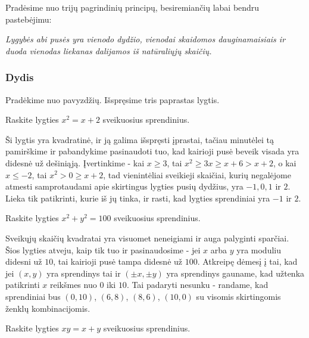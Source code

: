 Pradėsime nuo trijų pagrindinių principų, besiremiančių labai bendru
pastebėjimu:

\smallskip
\begin{center}\emph{Lygybės abi pusės yra vienodo dydžio, vienodai skaidomos
dauginamaisiais ir duoda vienodas liekanas dalijamos iš natūraliųjų
skaičių.}\end{center}
\smallskip

\subsubsection{Dydis}

Pradėkime nuo pavyzdžių. Išspręsime tris paprastas lygtis.
\begin{pav} 
  Raskite lygties $x^2 = x + 2$ sveikuosius sprendinius.
\end{pav}

\begin{sprendimas}
  Ši lygtis yra kvadratinė, ir ją galima išspręsti įprastai, tačiau minutėlei tą
  pamirškime ir pabandykime pasinaudoti tuo, kad kairioji pusė beveik visada yra didesnė
  už dešiniąją. Įvertinkime - kai $x\geq 3$, tai $x^2 \geq 3x \geq x + 6 >
  x+2$, o kai $x\leq -2$, tai $x^2 > 0 \geq x+2$, tad vienintėliai sveikieji
  skaičiai, kurių negalėjome atmesti samprotaudami apie skirtingus lygties
  pusių dydžius, yra $-1, 0, 1$ ir $2$. Lieka tik patikrinti, kurie iš jų
  tinka, ir rasti, kad lygties sprendiniai yra $-1$ ir $2$. 
\end{sprendimas}

\begin{pav}
  Raskite lygties $x^2 + y^2 = 100$ sveikuosius sprendinius.
\end{pav}

\begin{sprendimas}
  Sveikųjų skaičių kvadratai yra visuomet neneigiami ir auga palyginti
  sparčiai. Šios lygties atveju, kaip tik tuo ir pasinaudosime - jei $x$ arba
  $y$ yra moduliu didesni už $10$, tai kairioji pusė tampa didesnė už
  $100$. Atkreipę dėmesį į tai, kad jei $(x,y)$ yra sprendinys tai ir
  $(\pm x,\pm y)$ yra sprendinys gauname, kad užtenka patikrinti $x$ 
  reikšmes nuo $0$ iki $10$. Tai padaryti nesunku - randame, kad sprendiniai
  bus $(0,10)$, $(6,8)$, $(8,6)$, $(10,0)$ su visomis skirtingomis ženklų
  kombinacijomis. 
\end{sprendimas}

\begin{pav}
  Raskite lygties $xy = x+y$ sveikuosius sprendinius.
\end{pav}

